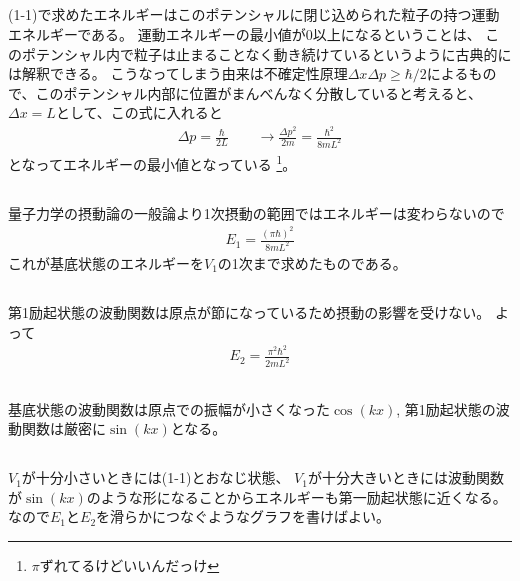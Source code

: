 \documentclass[../../master.tex]{subfiles}
\begin{document}
\subsection{}
(1-1)で求めたエネルギーはこのポテンシャルに閉じ込められた粒子の持つ運動エネルギーである。
運動エネルギーの最小値が0以上になるということは、
このポテンシャル内で粒子は止まることなく動き続けているというように古典的には解釈できる。
こうなってしまう由来は不確定性原理\(\Delta x \Delta p \geq \hbar /2\)によるもので、このポテンシャル内部に位置がまんべんなく分散していると考えると、
\(\Delta x = L\)として、この式に入れると
\begin{align}
    \Delta p = \frac{\hbar}{2L} \qquad \rightarrow \frac{\Delta p^2}{2m} = \frac{\hbar^2}{8mL^2}
\end{align}
となってエネルギーの最小値となっている
\footnote{\(\pi\)ずれてるけどいいんだっけ}。

\subsection{}
量子力学の摂動論の一般論より1次摂動の範囲ではエネルギーは変わらないので
\begin{align}
    E_1 = \frac{(\pi\hbar)^2}{8mL^2}
\end{align}
これが基底状態のエネルギーを\(V_1\)の1次まで求めたものである。

\subsection{}
第1励起状態の波動関数は原点が節になっているため摂動の影響を受けない。
よって
\begin{align}
    E_2 = \frac{\pi^2\hbar^2}{2mL^2}
\end{align}

\subsection{}
基底状態の波動関数は原点での振幅が小さくなった\(\cos(kx)\),
第1励起状態の波動関数は厳密に\(\sin(kx)\)となる。

\subsection{}
\(V_1\)が十分小さいときには(1-1)とおなじ状態、
\(V_1\)が十分大きいときには波動関数が\(\sin(kx)\)のような形になることからエネルギーも第一励起状態に近くなる。
なので\(E_1\)と\(E_2\)を滑らかにつなぐようなグラフを書けばよい。
\end{document}
